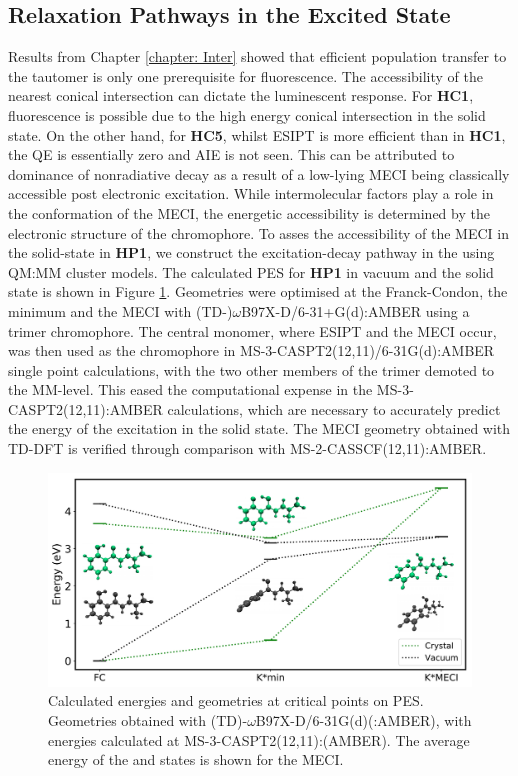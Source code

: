 \subsection{Relaxation Pathways in the Excited State}\label{section: Connecting_Relaxation}
Results from Chapter \ref{chapter: Inter} showed that efficient population transfer to the \Kstar{} tautomer is only one prerequisite for fluorescence. The accessibility of the nearest conical intersection can dictate the luminescent response. For \textbf{HC1}, fluorescence is possible due to the high energy conical intersection in the solid state. On the other hand, for \textbf{HC5}, whilst ESIPT is more efficient than in \textbf{HC1}, the QE is essentially zero and AIE is not seen. This can be attributed to dominance of nonradiative decay as a result of a low-lying MECI being classically accessible post electronic excitation. While intermolecular factors play a role in the conformation of the MECI, the energetic accessibility is determined by the electronic structure of the chromophore. To asses the accessibility of the MECI in the solid-state in \textbf{HP1}, we construct the excitation-decay pathway in the using QM:MM cluster models. The calculated PES for \textbf{HP1} in vacuum and the solid state is shown in Figure \ref{figure: HP1_crystal_vs_vac}.
Geometries were optimised at the Franck-Condon, the \Kstar{} minimum and the MECI with (TD-)$\omega$B97X-D/6-31+G(d):AMBER using a trimer chromophore. The central monomer, where ESIPT and the MECI occur, was then used as the chromophore in MS-3-CASPT2(12,11)/6-31G(d):AMBER single point calculations, with the two other members of the trimer demoted to the MM-level. This eased the computational expense in the MS-3-CASPT2(12,11):AMBER calculations, which are necessary to accurately predict the energy of the \sone{} excitation in the solid state. The MECI geometry obtained with TD-DFT is verified through comparison with MS-2-CASSCF(12,11):AMBER.
\begin{figure}[t]
\centering
  \includegraphics[width=0.9\linewidth]{5ConnectingCrystalStructure/HP1_crystal_vs_vac}
  \caption[PES for \textbf{HP1} in vacuum and the solid state]{Calculated energies and geometries at critical points on PES. Geometries obtained with (TD)-$\omega$B97X-D/6-31G(d)(:AMBER), with energies calculated at MS-3-CASPT2(12,11):(AMBER). The average energy of the \sone{} and \szero{} states is shown for the MECI.}
  \label{figure: HP1_crystal_vs_vac}
\end{figure}
